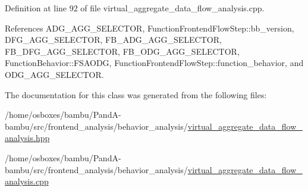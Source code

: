 Definition at line 92 of file virtual\+\_\+aggregate\+\_\+data\+\_\+flow\+\_\+analysis.\+cpp.



References A\+D\+G\+\_\+\+A\+G\+G\+\_\+\+S\+E\+L\+E\+C\+T\+OR, Function\+Frontend\+Flow\+Step\+::bb\+\_\+version, D\+F\+G\+\_\+\+A\+G\+G\+\_\+\+S\+E\+L\+E\+C\+T\+OR, F\+B\+\_\+\+A\+D\+G\+\_\+\+A\+G\+G\+\_\+\+S\+E\+L\+E\+C\+T\+OR, F\+B\+\_\+\+D\+F\+G\+\_\+\+A\+G\+G\+\_\+\+S\+E\+L\+E\+C\+T\+OR, F\+B\+\_\+\+O\+D\+G\+\_\+\+A\+G\+G\+\_\+\+S\+E\+L\+E\+C\+T\+OR, Function\+Behavior\+::\+F\+S\+A\+O\+DG, Function\+Frontend\+Flow\+Step\+::function\+\_\+behavior, and O\+D\+G\+\_\+\+A\+G\+G\+\_\+\+S\+E\+L\+E\+C\+T\+OR.



The documentation for this class was generated from the following files\+:\begin{DoxyCompactItemize}
\item 
/home/osboxes/bambu/\+Pand\+A-\/bambu/src/frontend\+\_\+analysis/behavior\+\_\+analysis/\hyperlink{virtual__aggregate__data__flow__analysis_8hpp}{virtual\+\_\+aggregate\+\_\+data\+\_\+flow\+\_\+analysis.\+hpp}\item 
/home/osboxes/bambu/\+Pand\+A-\/bambu/src/frontend\+\_\+analysis/behavior\+\_\+analysis/\hyperlink{virtual__aggregate__data__flow__analysis_8cpp}{virtual\+\_\+aggregate\+\_\+data\+\_\+flow\+\_\+analysis.\+cpp}\end{DoxyCompactItemize}
